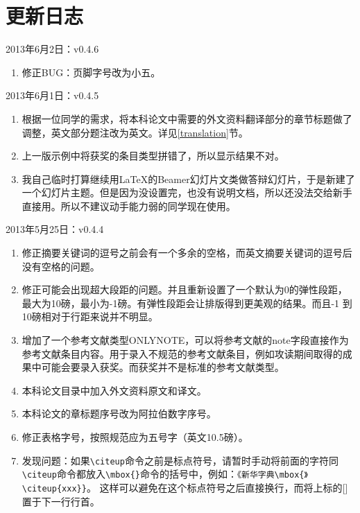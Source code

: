 
\chapter{更新日志}
\noindent
2013年6月2日：v0.4.6
\begin{enumerate}
\item 修正BUG：页脚字号改为小五。
\end{enumerate}

\noindent
2013年6月1日：v0.4.5
\begin{enumerate}
\item 根据一位同学的需求，将本科论文中需要的外文资料翻译部分的章节标题做了调整，英文部分题注改为英文。详见\ref{translation}节。
\item 上一版示例中将获奖的条目类型拼错了，所以显示结果不对。
\item 我自己临时打算继续用LaTeX的Beamer幻灯片文类做答辩幻灯片，于是新建了一个幻灯片主题。但是因为没设置完，也没有说明文档，所以还没法交给新手直接用。所以不建议动手能力弱的同学现在使用。
\end{enumerate}

\noindent
2013年5月25日：v0.4.4
\begin{enumerate}
\item 修正摘要关键词的逗号之前会有一个多余的空格，而英文摘要关键词的逗号后没有空格的问题。
\item 修正可能会出现超大段距的问题。并且重新设置了一个默认为0的弹性段距，最大为10磅，最小为-1磅。有弹性段距会让排版得到更美观的结果。而且-1 到10磅相对于行距来说并不明显。
\item 增加了一个参考文献类型ONLYNOTE，可以将参考文献的note字段直接作为参考文献条目内容。用于录入不规范的参考文献条目，例如攻读期间取得的成果中可能会要录入获奖\cite{onlynoteexample}。而获奖并不是标准的参考文献类型。
\item 本科论文目录中加入外文资料原文和译文。
\item 本科论文的章标题序号改为阿拉伯数字序号。
\item 修正表格字号，按照规范应为五号字（英文10.5磅）。
\item 发现问题：如果\verb|\citeup|命令之前是标点符号，请暂时手动将前面的字符同\verb|\citeup|命令都放入\verb|\mbox{}|命令的括号中，例如：\verb|《新华字典\mbox{》\citeup{xxx}}|。 这样可以避免在这个标点符号之后直接换行，而将上标的[] 置于下一行行首。
\end{enumerate}

